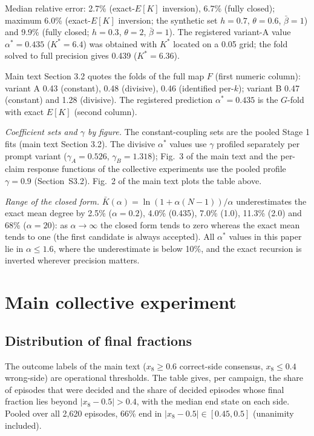 \documentclass[11pt]{article}
\newcommand{\astar}{\alpha^{*}}
\begin{document}
\begin{center}
\small
\resizebox{\textwidth}{!}{}
\end{center}

Median relative error: 2.7\% (exact-$E[K]$ inversion), 6.7\% (fully closed);
maximum 6.0\% (exact-$E[K]$ inversion; the synthetic set $h = 0.7$,
$\theta = 0.6$, $\bar\beta = 1$) and 9.9\% (fully closed; $h = 0.3$,
$\theta = 2$, $\bar\beta = 1$). The registered variant-A value
$\astar = 0.435$ ($K^* = 6.4$) was obtained with $K^*$ located on a 0.05 grid;
the fold solved to full precision gives 0.439 ($K^* = 6.36$).

Main text Section 3.2 quotes the folds of the full map $F$ (first numeric
column): variant A 0.43 (constant), 0.48 (divisive), 0.46 (identified
per-$k$); variant B 0.47 (constant) and 1.28 (divisive). The registered
prediction $\astar = 0.435$ is the $G$-fold with exact $E[K]$ (second
column).

\emph{Coefficient sets and $\gamma$ by figure.} The constant-coupling sets are
the pooled Stage 1 fits (main text Section 3.2). The divisive $\astar$ values
use $\gamma$ profiled separately per prompt variant ($\gamma_A = 0.526$,
$\gamma_B = 1.318$); Fig.~3 of the main text and the per-claim response
functions of the collective experiments use the pooled profile $\gamma = 0.9$
(Section~S3.2). Fig.~2 of the main text plots the table above.

\emph{Range of the closed form.} $\bar K(\alpha) = \ln(1 + \alpha(N-1))/\alpha$
underestimates the exact mean degree by 2.5\% ($\alpha = 0.2$), 4.0\%
(0.435), 7.0\% (1.0), 11.3\% (2.0) and 68\% ($\alpha = 20$): as
$\alpha \to \infty$ the closed form tends to zero whereas the exact mean tends
to one (the first candidate is always accepted). All $\astar$ values in this
paper lie in $\alpha \le 1.6$, where the underestimate is below 10\%, and the
exact recursion is inverted wherever precision matters.

\section{Main collective experiment}

\subsection{Distribution of final fractions}

The outcome labels of the main text ($x_8 \ge 0.6$ correct-side consensus,
$x_8 \le 0.4$ wrong-side) are operational thresholds. The table gives, per
campaign, the share of episodes that were decided and the share of decided
episodes whose final fraction lies beyond $|x_8 - 0.5| > 0.4$, with the
median end state on each side. Pooled over all 2{,}620 episodes, 66\% end in
$|x_8 - 0.5| \in [0.45, 0.5]$ (unanimity included).
\begin{center}
\small
\resizebox{\textwidth}{!}{}
\end{center}
\end{document}
